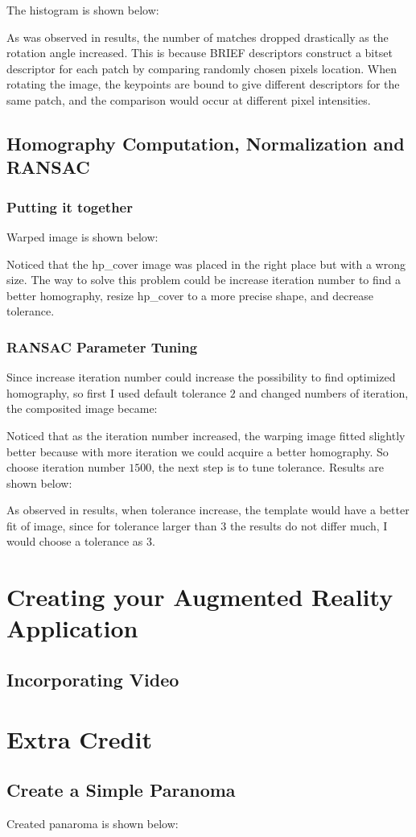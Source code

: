 \documentclass[11pt]{article} \usepackage{fullpage} \usepackage{graphicx} \usepackage{epstopdf} \usepackage{color} \usepackage{psfrag} \usepackage{pdfsync}\usepackage{indentfirst}\usepackage{subfigure}\usepackage{float}\usepackage[section]{placeins}
\begin{document}
The histogram is shown below:


As was observed in results, the number of matches dropped drastically as the rotation angle increased. This is because BRIEF descriptors construct a bitset descriptor for each patch by comparing randomly chosen pixels location. When rotating the image, the keypoints are bound to give different descriptors for the same patch, and the comparison would occur at different pixel intensities.

\setcounter{subsection}{1}
\subsection{Homography Computation, Normalization and RANSAC}

\setcounter{subsubsection}{3}
\subsubsection{Putting it together}

Warped image is shown below:

Noticed that the hp\_cover image was placed in the right place but with a wrong size. The way to solve this problem could be increase iteration number to find a better homography, resize hp\_cover to a more precise shape, and decrease tolerance.

\subsubsection{RANSAC Parameter Tuning}

Since increase iteration number could increase the possibility to find optimized homography, so first I used default tolerance $2$ and changed numbers of iteration, the composited image became:


Noticed that as the iteration number increased, the warping image fitted slightly better because with more iteration we could acquire a better homography. So choose iteration number $1500$, the next step is to tune tolerance. Results are shown below:


As observed in results, when tolerance increase, the template would have a better fit of image, since for tolerance larger than $3$ the results do not differ much, I would choose a tolerance as $3$.

\section{Creating your Augmented Reality Application}
\setcounter{subsection}{0}
\subsection{Incorporating Video}

\section{Extra Credit}
\setcounter{subsection}{1}
\subsection{Create a Simple Paranoma}

Created panaroma is shown below:
\end{document}
